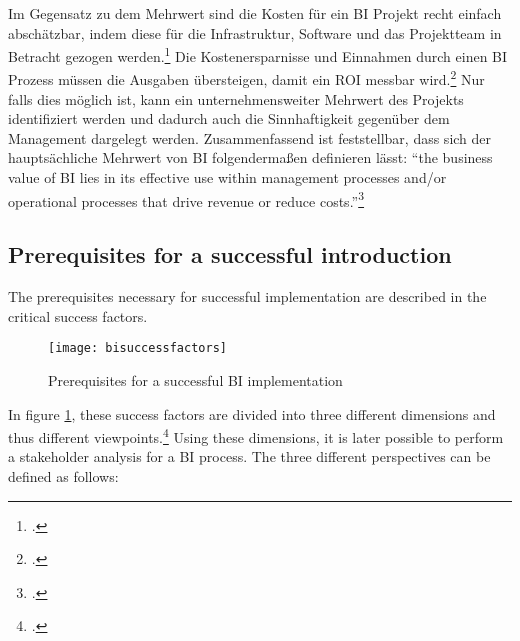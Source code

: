 Im Gegensatz zu dem Mehrwert sind die Kosten für ein \ac{BI} Projekt recht einfach abschätzbar, indem diese für die Infrastruktur,
Software und das Projektteam in Betracht gezogen werden.\footcite[Cf.][p. 98]{hovcevar2010assessing} Die Kostenersparnisse
und Einnahmen durch einen \ac{BI} Prozess müssen die Ausgaben übersteigen, damit ein \ac{ROI} messbar
wird.\footcite[Cf.][p. 8]{williams2003business} Nur falls dies möglich ist, kann ein unternehmensweiter Mehrwert des Projekts
identifiziert werden und dadurch auch die Sinnhaftigkeit gegenüber dem Management dargelegt werden. Zusammenfassend ist
feststellbar, dass sich der hauptsächliche Mehrwert von BI folgendermaßen definieren lässt: "`the business value of BI lies in
its effective use within management processes and/or operational processes that drive revenue or reduce
costs."'\footcite[][p. 7]{williams2003business}

\subsection{Prerequisites for a successful introduction} \label{toc:einfuehrungsstrategien}

The prerequisites necessary for successful implementation are described in the critical success factors.

\begin{figure}[H]
    \caption{Prerequisites for a successful BI implementation}
    \texttt{[image: bisuccessfactors]}
    \label{figure:bisuccessfactors}
    \\
    \cite[Source: Based on][Fig. 1]{yeoh2010critical}
\end{figure}

In figure \ref{figure:bisuccessfactors}, these success factors are divided into three different dimensions and thus different
viewpoints.\footcite[Cf.][pp. 26]{yeoh2010critical} Using these dimensions, it is later possible to perform a
stakeholder analysis for a \ac{BI} process. The three different perspectives can be defined as follows:

